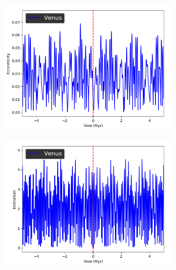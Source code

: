 \documentclass[11pt, oneside]{article}   	%
\begin{document}
\begin{figure}[!h]
	\ContinuedFloat
    \centering
    \begin{subfigure}[t]{0.49\textwidth}
    \captionsetup{width=0.9\textwidth}
	\centering
       	 \includegraphics[width=\textwidth]{Eccentricity_Venus}
    \end{subfigure}
    \begin{subfigure}[t]{0.49\textwidth}
    \captionsetup{width=0.9\textwidth}
        	\centering
	\includegraphics[width=\textwidth]{Inclination_Venus}
    \end{subfigure}
\end{figure}
\end{document}
